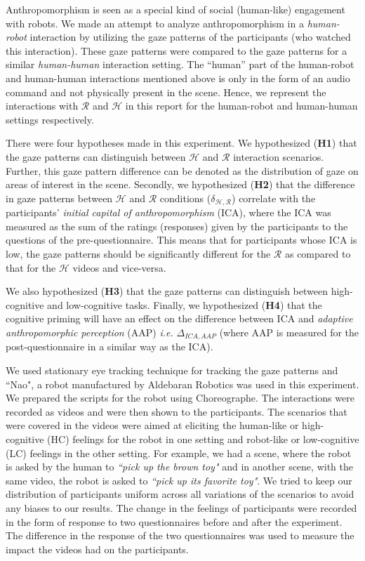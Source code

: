 \documentclass{acm_proc_article-sp}
\newcommand{\ie}{{\textit{i.e.\xspace}}}
\begin{document}
Anthropomorphism is seen as a special kind of social (human-like) engagement
with robots. We made an attempt to analyze anthropomorphism in a
\textit{human-robot} interaction by utilizing the gaze patterns of the
participants (who watched this interaction). These gaze patterns were compared
to the gaze patterns for a similar \textit{human-human} interaction setting. The
``human'' part of the human-robot and human-human interactions mentioned above
is only in the form of an audio command and not physically present in the scene.
Hence, we represent the interactions with $\mathcal{R}$ and $\mathcal{H}$ in
this report for the human-robot and human-human settings respectively.

There were four hypotheses made in this experiment. We hypothesized
(\textbf{H1}) that the gaze patterns can distinguish between $\mathcal{H}$ and
$\mathcal{R}$ interaction scenarios. Further, this gaze pattern difference can
be denoted as the distribution of gaze on areas of interest in the scene.
Secondly, we hypothesized (\textbf{H2}) that the difference in gaze patterns
between $\mathcal{H}$ and $\mathcal{R}$ conditions
($\delta_{\mathcal{H},\mathcal{R}}$) correlate with the participants'
\textit{initial capital of anthropomorphism} (ICA), where the ICA was measured
as the sum of the ratings (responses) given by the participants to the questions
of the pre-questionnaire. This means that for participants whose ICA is low, the
gaze patterns should be significantly different for the $\mathcal{R}$ as
compared to that for the $\mathcal{H}$ videos and vice-versa.

We also hypothesized (\textbf{H3}) that the gaze patterns can distinguish
between high-cognitive and low-cognitive tasks. Finally, we hypothesized
(\textbf{H4}) that the cognitive priming will have an effect on the difference
between ICA and \textit{adaptive anthropomorphic perception} (AAP) \ie
$\Delta_{ICA,AAP}$ (where AAP is measured for the post-questionnaire in a
similar way as the ICA).

We used stationary eye tracking technique for tracking the gaze patterns and
``Nao", a robot manufactured by Aldebaran Robotics was used in this
experiment. We prepared the scripts for the robot using Choreographe. The
interactions were recorded as videos and were then shown to the participants.
The scenarios that were covered in the videos were aimed at eliciting the
human-like or high-cognitive (HC) feelings for the robot in one setting and
robot-like or low-cognitive (LC) feelings in the other setting. For example, we
had a scene, where the robot is asked by the human to \textit{``pick up the
brown toy"} and in another scene, with the same video, the robot is asked to
\textit{``pick up its favorite toy"}. We tried to keep our distribution of
participants uniform across all variations of the scenarios to avoid any biases
to our results. The change in the feelings of participants were recorded in the
form of response to two questionnaires before and after the experiment. The
difference in the response of the two questionnaires was used to measure the
impact the videos had on the participants. 
\end{document}
